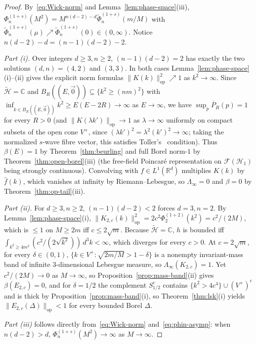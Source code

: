 \documentclass[11pt,a4paper]{article}
\theoremstyle{definition}
\theoremstyle{remark}
\newcommand{\HH}{\mathcal{H}}
\newcommand{\tH}{\widetilde{\mathcal{H}}}
\newcommand{\RR}{\mathbb{R}}
\newcommand{\CC}{\mathbb{C}}
\newcommand{\op}{\mathrm{op}}
\newcommand{\norm}[1]{\|#1\|}
\begin{document}
\begin{proof}
By~\eqref{eq:Wick-norm} and Lemma~\ref{lem:phase-space}(iii), $\Phi_n^{(1+s)}(M^2) = M^{n(d-2)-d}\widetilde{\Phi}_n^{(1+s)}(m/M)$ with $\widetilde{\Phi}_n^{(1+s)}(\mu)\nearrow\widetilde{\Phi}_n^{(1+s)}(0)\in(0,\infty)$. Notice $n(d-2)-d = (n-1)(d-2)-2$.

\emph{Part (i).} Over integers $d\ge 3, n\ge 2$, $(n-1)(d-2)=2$ has exactly the two solutions $(d,n)=(4,2)$ and $(3,3)$. In both cases Lemma~\ref{lem:phase-space}(i)--(ii) gives the explicit norm formulas $\norm{K(k)}_{\op}^2\nearrow 1$ as $k^2\to\infty$. Since $\tH=\CC$ and $B_R((E,\vec{0}))\subseteq\{k^2\ge (nm)^2\}$ with $\inf_{k\in B_R((E,\vec{0}))} k^2 \ge E(E-2R)\to\infty$ as $E\to\infty$, we have $\sup_p \overline{P}_R(p)=1$ for every $R>0$ (and $\norm{K(\lambda k')}_{\op}\to 1$ as $\lambda\to\infty$ uniformly on compact subsets of the open cone $V^+$, since $(\lambda k')^2=\lambda^2(k')^2\to\infty$; taking the normalized $s$-wave fibre vector, this satisfies Toller's~\cite[Prop.~5]{Toller1999} condition). Thus $\beta(E)=1$ by Theorem~\ref{thm:beurling} and full Borel norm-$1$ by Theorem~\ref{thm:open-borel}(iii) (the free-field Poincar\'e representation on $\mathcal{F}(\HH_1)$ being strongly continuous). Convolving with $f\in L^1(\RR^d)$ multiplies $K(k)$ by $\widehat{f}(k)$, which vanishes at infinity by Riemann--Lebesgue, so $\Lambda_\infty=0$ and $\beta=0$ by Theorem~\ref{thm:op-tail}(iii).

\emph{Part (ii).} For $d\ge 3, n\ge 2$, $(n-1)(d-2)<2$ forces $d=3, n=2$. By Lemma~\ref{lem:phase-space}(i), $\norm{K_{2,c}(k)}_{\op}^2 = 2c^2\Phi_2^{(1+2)}(k^2) = c^2/(2M)$, which is $\le 1$ on $M\ge 2m$ iff $c\le 2\sqrt{m}$. Because $\tH=\CC$, $h$ is bounded iff $\int_{k^2\ge 4m^2}(c^2/(2\sqrt{k^2}))\,d^3k<\infty$, which diverges for every $c>0$. At $c=2\sqrt{m}$, for every $\delta\in(0,1)$, $\{k\in V^+: \sqrt{2m/M}>1-\delta\}$ is a nonempty invariant-mass band of infinite $3$-dimensional Lebesgue measure, so $\Lambda_\infty(K_{2,c})=1$. Yet $c^2/(2M)\to 0$ as $M\to\infty$, so Proposition~\ref{prop:mass-band}(ii) gives $\beta(E_{2,c})=0$, and for $\delta=1/2$ the complement $S_{1/2}^c$ contains $\{k^2> 4c^4\}\cup (V^+)^c$ and is thick by Proposition~\ref{prop:mass-band}(i), so Theorem~\ref{thm:lsk}(i) yields $\norm{E_{2,c}(\Delta)}_{\op}<1$ for every bounded Borel $\Delta$.

\emph{Part (iii)} follows directly from~\eqref{eq:Wick-norm} and~\eqref{eq:phin-asymp}: when $n(d-2)>d$, $\Phi_n^{(1+s)}(M^2)\to\infty$ as $M\to\infty$.
\end{proof}
\end{document}
